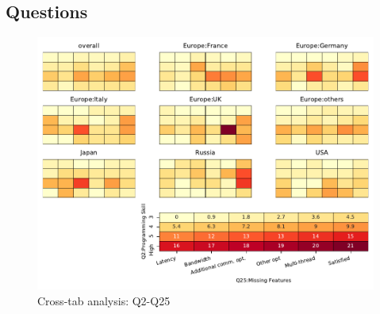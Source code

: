 
\subsection{Questions}


\begin{figure}
\begin{center}
\includegraphics[width=12cm]{../pdfs/Q2-Q25.pdf}
\caption{Cross-tab analysis: Q2-Q25}
\label{fig:Q2-Q25}
\end{center}
\end{figure}
